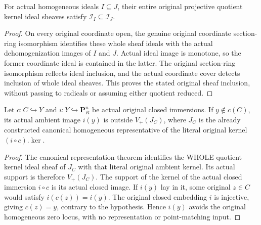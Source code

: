 \begin{lemma}
\label{lem:pl-gauss-original-quotient-ideal-sheaf-monotone}
\leanok
For actual homogeneous ideals $I\subseteq J$, their entire original
projective quotient kernel ideal sheaves satisfy
$\mathcal I_I\subseteq\mathcal I_J$.
\end{lemma}
\begin{proof}
On every original coordinate open, the genuine original coordinate
section-ring isomorphism identifies these whole sheaf ideals with the
actual dehomogenization images of $I$ and $J$. Actual ideal image is
monotone, so the former coordinate ideal is contained in the latter.
The original section-ring isomorphism reflects ideal inclusion, and
the actual coordinate cover detects inclusion of whole ideal sheaves.
This proves the stated original sheaf inclusion, without passing to
radicals or assuming either quotient reduced.
\end{proof}

\begin{lemma}
\label{lem:pl-gauss-original-kernel-representative-point-avoidance}
\leanok
Let $c:C\hookrightarrow Y$ and $i:Y\hookrightarrow\mathbf P^n_R$ be
actual original closed immersions. If $y\notin c(C)$, its actual
ambient image $i(y)$ is outside $V_+(J_C)$, where $J_C$ is the already
constructed canonical homogeneous representative of the literal
original kernel $(i\circ c).\ker$.
\end{lemma}
\begin{proof}
The canonical representation theorem identifies the WHOLE quotient
kernel ideal sheaf of $J_C$ with that literal original ambient kernel.
Its actual support is therefore $V_+(J_C)$. The support of the kernel
of the actual closed immersion $i\circ c$ is its actual closed image.
If $i(y)$ lay in it, some original $z\in C$ would satisfy
$i(c(z))=i(y)$. The original closed embedding $i$ is injective, giving
$c(z)=y$, contrary to the hypothesis. Hence $i(y)$ avoids the original
homogeneous zero locus, with no representation or point-matching input.
\end{proof}

